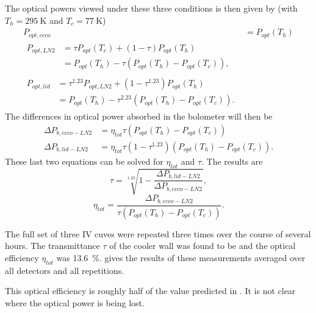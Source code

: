 The optical powers viewed under these three conditions is then given by (with $T_h = \SI{295}{\K}$ and $T_c = \SI{77}{\K}$)
\begin{align}
  P_{opt,ecco}  & = P_{opt}(T_h) \\
  \begin{split}
    P_{opt,LN2} & = \tau P_{opt}(T_c) + (1-\tau)P_{opt}(T_h) \\
              & = P_{opt}(T_h) - \tau (P_{opt}(T_h) - P_{opt}(T_c)),
  \end{split} \\
  \begin{split}
    P_{opt,lid} & = \tau^{1.23} P_{opt,LN2} + (1-\tau^{1.23})P_{opt}(T_h) \\
              & = P_{opt}(T_h) - \tau^{2.23}(P_{opt}(T_h) - P_{opt}(T_c)) .
  \end{split}
\end{align}
The differences in optical power absorbed in the bolometer will then be
\begin{align}
  \Delta P_{b,ecco-LN2} & = \eta_{tot} \tau (P_{opt}(T_h) - P_{opt}(T_c)) \\
  \Delta P_{b,lid-LN2}  & = \eta_{tot} \tau (1-\tau^{1.23}) (P_{opt}(T_h) - P_{opt}(T_c)).
\end{align}
These last two equations can be solved for $\eta_{tot}$ and $\tau$. The results are
\begin{equation}
   \tau = \sqrt[1.23]{1 - \frac{\Delta P_{b,lid-LN2}}{\Delta P_{b,ecco-LN2}}},
\end{equation}
\begin{equation}
   \eta_{tot} = \frac{\Delta P_{b,ecco-LN2}}{ \tau ( P_{opt}(T_h) - P_{opt}(T_c) )} .
\end{equation}

The full set of three IV cuves were repeated three times over the course of several hours.
The transmittance $\tau$ of the cooler wall was found to be  and the optical efficiency $\eta_{tot}$ was \SI{13.6}{\percent}. 
 gives the results of these measurements averaged over all detectors and all repetitions.

This optical efficiency is roughly half of the value predicted in .
It is not clear where the optical power is being lost.

